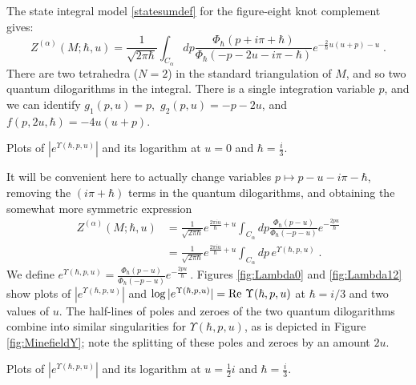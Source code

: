 \documentclass[hyper]{JHEP3}
\renewcommand{\Re}{{\rm Re}\,}
\newcommand\be{\begin{equation}}
\newcommand\ee{\end{equation}}
\begin{document}
The state integral model \eqref{statesumdef} for the figure-eight knot complement gives:
\be
Z^{(\alpha)} (M; \hbar, u) = \frac{1}{\sqrt{2 \pi \hbar}} \int_{C_{\alpha}} dp
\frac{\Phi_{\hbar} (p + i\pi +\hbar)}{\Phi_{\hbar}(-p-2u-i\pi-\hbar) }
e^{-\frac{2}{\hbar}u(u+p) -u}\;.
\label{base_Hik_41}
\ee
There are two tetrahedra ($N=2$) in the standard triangulation of $M$,
and so two quantum dilogarithms in the integral.
There is a single integration variable $p$, and we can identify
$g_1(p,u) = p$,\, $g_2(p,u) = -p-2u$, and $f(p,2u,\hbar) = -4u(u+p)$.


%
{Plots of $|e^{\Upsilon(\hbar,p,u)}|$ and its logarithm at $u=0$ and $\hbar = \frac{i}{3}$.
\label{fig:Lambda0} }


It will be convenient here to actually change variables $p\mapsto p-u-i\pi-\hbar$,
removing the $(i\pi+\hbar)$ terms in the quantum dilogarithms,
and obtaining the somewhat more symmetric expression
\begin{align}
Z^{(\alpha)} (M; \hbar, u)
&= \frac{1}{\sqrt{2 \pi \hbar}}
e^{\frac{2\pi iu}{\hbar}+u}\int_{C_{\alpha}} dp \frac{\Phi_{\hbar}(p-u)}{\Phi_{\hbar}(-p-u)} e^{-\frac{2pu}{\hbar}}
\label{Hik41} \\
&= \frac{1}{\sqrt{2 \pi \hbar}}e^{\frac{2\pi iu}{\hbar}+u}\int_{C_{\alpha}} dp\, e^{\Upsilon(\hbar,p,u)}\;.
\end{align}
%
We define $e^{\Upsilon(\hbar,p,u)} = \frac{\Phi_{\hbar}(p-u)}{\Phi_{\hbar}(-p-u)}e^{-\frac{2pu}{\hbar}}$\,.
Figures \ref{fig:Lambda0} and \ref{fig:Lambda12} show plots of
$|e^{\Upsilon(\hbar,p,u)}|$ and $\log|e^{\Upsilon(\hbar,p,u)}| = \Re\,\Upsilon(\hbar,p,u)$
at $\hbar = i/3$ and two values of $u$.
The half-lines of poles and zeroes of the two quantum dilogarithms combine
into similar singularities for $\Upsilon(\hbar,p,u)$, as is depicted in Figure \ref{fig:MinefieldY};
note the splitting of these poles and zeroes by an amount $2u$.


%
{Plots of $|e^{\Upsilon(\hbar,p,u)}|$ and its logarithm at $u=\frac{1}{2}i$ and $\hbar = \frac{i}{3}$.
\label{fig:Lambda12} }
\end{document}
